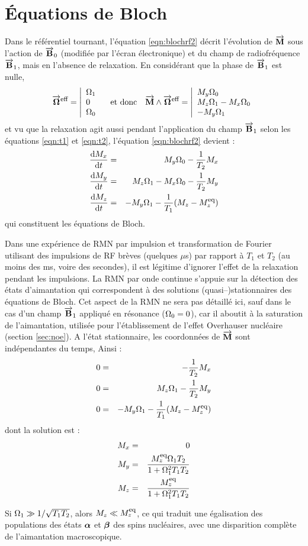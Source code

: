 \section{Équations de Bloch}
\label{sec:eqnbloch}
Dans le référentiel tournant, l'équation \ref{eqn:blochrf2} décrit l'évolution
de $\overrightarrow{\mathbf{M}}$ sous l'action de $\overrightarrow{\mathbf{B}}_0$ (modifiée par l'écran électronique)
et du champ de radiofréquence $\overrightarrow{\mathbf{B}}_1$, mais en l'absence de relaxation.
En considérant que la phase de $\overrightarrow{\mathbf{B}}_1$ est nulle, 
\begin{equation}
\overrightarrow{\mathbf{\Omega}}^{\mbox{\footnotesize{eff}}} = \left| \begin{array}{l}\Omega_1 \\ 0 \\ \Omega_0 \end{array} \right.
\quad\mbox{et donc}\quad
\overrightarrow{\mathbf{M}}\wedge\overrightarrow{\mathbf{\Omega}}^{\mbox{\footnotesize{eff}}} = \left| \begin{array}{l} 
M_y\Omega_0 \\ M_z\Omega_1-M_x\Omega_0 \\ -M_y\Omega_1 \end{array} \right.
\end{equation}
et vu que la relaxation agit aussi pendant l'application du champ $\overrightarrow{\mathbf{B}}_1$
selon les équations \ref{eqn:t1} et \ref{eqn:t2}, l'équation \ref{eqn:blochrf2}
devient :
\begin{eqnarray}
\frac{\mbox{d}M_x}{\mbox{d} t} & = & M_y\Omega_0 - \frac{1}{T_2}M_x \\
\frac{\mbox{d}M_y}{\mbox{d} t} & = & M_z\Omega_1-M_x\Omega_0 - \frac{1}{T_2}M_y \\
\frac{\mbox{d}M_z}{\mbox{d} t} & = & -M_y\Omega_1 - \frac{1}{T_1} (M_z-M^{\mbox{\footnotesize{eq}}}_z)
\end{eqnarray}
qui constituent les équations de Bloch.

Dans une expérience de RMN par impulsion et transformation de Fourier
utilisant des impulsions de RF brèves (quelques $\mu$s) par rapport à
$T_1$ et $T_2$ (au moins des ms, voire des secondes),
il est légitime d'ignorer l'effet de la relaxation pendant les impulsions.
La RMN par onde continue s'appuie sur la détection des états d'aimantation
qui correspondent à des solutions (quasi--)stationnaires des équations de Bloch.
Cet aspect de la RMN ne sera pas détaillé ici, sauf dans le cas
d'un champ $\overrightarrow{\mathbf{B}}_1$ appliqué en résonance ($\Omega_0 = 0$), car il aboutit
à la saturation de l'aimantation, utilisée pour l'établissement
de l'effet Overhauser nucléaire (section \ref{sec:noe}).
A l'état stationnaire, les coordonnées de $\overrightarrow{\mathbf{M}}$ sont indépendantes
du temps, Ainsi :
\begin{eqnarray}
0 & = & - \frac{1}{T_2}M_x \\
0 & = & M_z\Omega_1 - \frac{1}{T_2}M_y \\
0 & = & -M_y\Omega_1 - \frac{1}{T_1} (M_z-M^{\mbox{\footnotesize{eq}}}_z)
\end{eqnarray}
dont la solution est :
\begin{eqnarray}
M_x & = & 0 \\
M_y & = & \frac{M^{\mbox{\footnotesize{eq}}}_z\Omega_1 T_2}{1+\Omega_1^2 T_1 T_2} \\
M_z & = & \frac{M^{\mbox{\footnotesize{eq}}}_z}{1+\Omega_1^2 T_1 T_2}
\end{eqnarray}

Si $\Omega_1 \gg 1/\sqrt{T_1 T_2}$, alors $M_z \ll M^{\mbox{\footnotesize{eq}}}_z$, ce qui
traduit une égalisation des populations des états $\boldsymbol{\alpha}$ et $\boldsymbol{\beta}$ des spins nucléaires,
avec une disparition complète de l'aimantation macroscopique.
